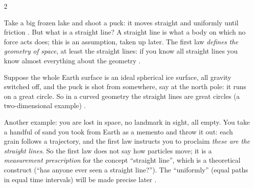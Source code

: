 \begin{paracol}{2}
\begin{intuition}
Take a big frozen lake and shoot a puck: it moves straight and uniformly until friction .
But what is a straight line? A straight line is what a body on which no force acts does; this is an assumption, taken
up later. The first law \emph{defines the geometry of space}, at least the straight lines: if you know all straight
lines you know almost everything about the geometry .\par
Suppose the whole Earth surface is an ideal spherical ice surface, all gravity switched off, and the puck is shot from
somewhere, say at the north pole: it runs on a great circle. So in a curved geometry the straight lines are great circles
(a two-dimensional example) .\par
Another example: you are lost in space, no landmark in sight, all empty. You take a handful of sand you took from Earth
as a memento and throw it out: each grain follows a trajectory, and the first law instructs you to proclaim
\emph{these are the straight lines}. So the first law does not say how particles move; it is a \emph{measurement
prescription} for the concept ``straight line'', which is a theoretical construct (``has anyone ever seen a straight
line?''). The ``uniformly'' (equal paths in equal time intervals) will be made precise later .
\end{intuition}


\end{paracol}
